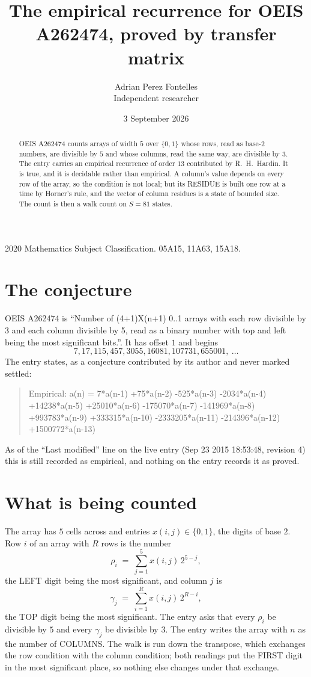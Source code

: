 \documentclass[11pt,a4paper]{article}
\title{The empirical recurrence for OEIS A262474, proved by transfer matrix}
\author{Adrian Perez Fontelles\\ \small Independent researcher}
\date{3 September 2026}
\theoremstyle{plain}
\theoremstyle{definition}
\begin{document}
\maketitle

\begin{abstract}
OEIS A262474 counts arrays of width $5$ over $\{0,1\}$ whose rows, read as base-$2$
numbers, are divisible by $5$ and whose columns, read the same way, are divisible by
$3$. The entry carries an empirical recurrence of order $13$ contributed by
R.~H.~Hardin. It is true, and it is decidable rather than empirical. A column's value depends on
every row of the array, so the condition is not local; but its RESIDUE is built one row at a
time by Horner's rule, and the vector of column residues is a state of bounded size. The count
is then a walk count on $S=81$ states.
\end{abstract}

\noindent\small 2020 Mathematics Subject Classification. 05A15, 11A63, 15A18.\normalsize

\section{The conjecture}

OEIS A262474 is ``Number of (4+1)X(n+1) 0..1 arrays with each row divisible by 3 and each column divisible by 5, read as a binary number with top and left being the most significant bits.''. It has offset $1$ and begins
\[
7, 17, 115, 457, 3055, 16081, 107731, 655001,\ \dots
\]
The entry states, as a conjecture contributed by its author and never marked settled:
\begin{quote}
Empirical: a(n) = 7*a(n-1) +75*a(n-2) -525*a(n-3) -2034*a(n-4) +14238*a(n-5) +25010*a(n-6) -175070*a(n-7) -141969*a(n-8) +993783*a(n-9) +333315*a(n-10) -2333205*a(n-11) -214396*a(n-12) +1500772*a(n-13)
\end{quote}
As of the ``Last modified'' line on the live entry (Sep 23 2015 18:53:48, revision 4) this is still
recorded as empirical, and nothing on the entry records it as proved.

\section{What is being counted}

The array has $5$ cells across and entries $x(i,j)\in\{0,1\}$, the digits of
base $2$. Row $i$ of an array with $R$ rows is the number
\[
\rho_i\;=\;\sum_{j=1}^{5}x(i,j)\,2^{5-j} ,
\]
the LEFT digit being the most significant, and column $j$ is
\[
\gamma_j\;=\;\sum_{i=1}^{R}x(i,j)\,2^{R-i} ,
\]
the TOP digit being the most significant. The entry asks that every $\rho_i$ be divisible by
$5$ and every $\gamma_j$ be divisible by $3$. The entry writes the array with $n$ as the number of COLUMNS. The walk is run down the transpose, which exchanges the row condition with the column condition; both readings put the FIRST digit in the most significant place, so nothing else changes under that exchange.
\end{document}
